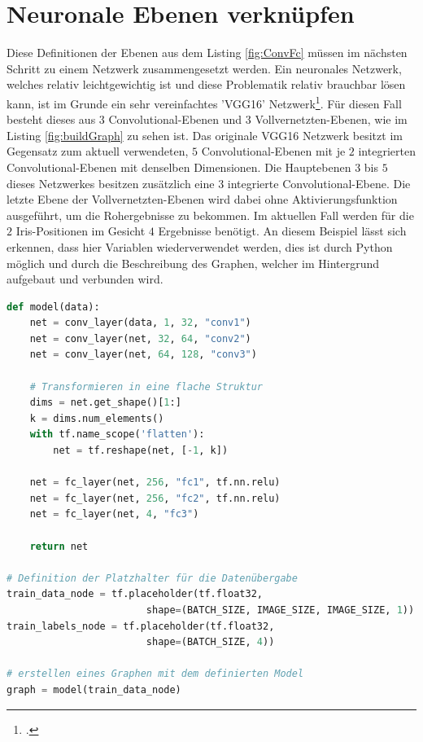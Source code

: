 \section{Neuronale Ebenen verknüpfen}

Diese Definitionen der Ebenen aus dem Listing \ref{fig:ConvFc} müssen im nächsten Schritt zu einem Netzwerk zusammengesetzt werden. 
Ein neuronales Netzwerk, welches relativ leichtgewichtig ist und diese Problematik relativ brauchbar lösen kann, ist im Grunde ein sehr vereinfachtes 'VGG16' Netzwerk\footcite{VGG16: https://arxiv.org/pdf/1409.1556.pdf}. 
Für diesen Fall besteht dieses aus $3$ Convolutional-Ebenen und $3$ Vollvernetzten-Ebenen, wie im Listing \ref{fig:buildGraph} zu sehen ist. 
Das originale VGG16 Netzwerk besitzt im Gegensatz zum aktuell verwendeten, $5$ Convolutional-Ebenen mit je $2$ integrierten Convolutional-Ebenen mit denselben Dimensionen.
Die Hauptebenen $3$ bis $5$ dieses Netzwerkes besitzen zusätzlich eine $3$ integrierte Convolutional-Ebene. 
Die letzte Ebene der Vollvernetzten-Ebenen wird dabei ohne Aktivierungsfunktion ausgeführt, um die Rohergebnisse zu bekommen. 
Im aktuellen Fall werden für die $2$ Iris-Positionen im Gesicht $4$ Ergebnisse benötigt. 
An diesem Beispiel lässt sich erkennen, dass hier Variablen wiederverwendet werden, dies ist durch Python möglich und durch die Beschreibung des Graphen, welcher im Hintergrund aufgebaut und verbunden wird. 
\begin{lstlisting}[caption={Modelldefinition des Graphen},label=fig:buildGraph,captionpos=b,language=Python]
def model(data):
    net = conv_layer(data, 1, 32, "conv1")
    net = conv_layer(net, 32, 64, "conv2")
    net = conv_layer(net, 64, 128, "conv3")

    # Transformieren in eine flache Struktur
    dims = net.get_shape()[1:]
    k = dims.num_elements()
    with tf.name_scope('flatten'):
        net = tf.reshape(net, [-1, k])
    
    net = fc_layer(net, 256, "fc1", tf.nn.relu)    
    net = fc_layer(net, 256, "fc2", tf.nn.relu)
    net = fc_layer(net, 4, "fc3")
    
    return net
    
# Definition der Platzhalter für die Datenübergabe
train_data_node = tf.placeholder(tf.float32, 
						shape=(BATCH_SIZE, IMAGE_SIZE, IMAGE_SIZE, 1))
train_labels_node = tf.placeholder(tf.float32, 
						shape=(BATCH_SIZE, 4))

# erstellen eines Graphen mit dem definierten Model
graph = model(train_data_node)
\end{lstlisting}

